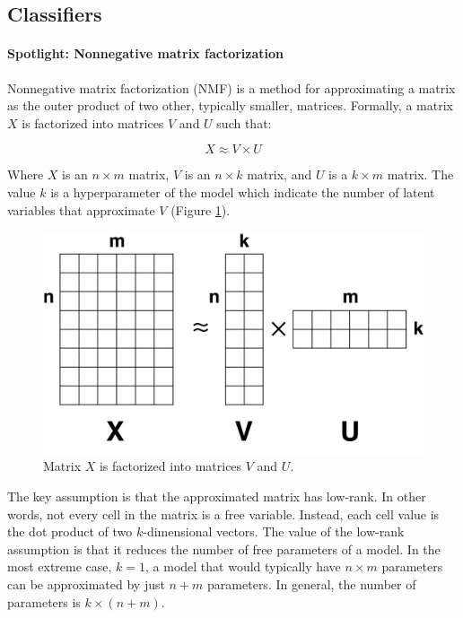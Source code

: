 \documentclass{article} %
\begin{document}
\subsection{Classifiers}\label{classifiers}

\paragraph{Spotlight: Nonnegative matrix factorization}

Nonnegative matrix factorization (NMF) is a method for approximating a matrix as the outer product of two other, typically smaller, matrices. Formally, a matrix $X$ is factorized into matrices $V$ and $U$ such that:

\begin{equation} \label{eq:1}
X \approx V \times U
\end{equation}

Where $X$ is an $n \times m$ matrix, $V$ is an $n \times k$ matrix, and $U$ is a $k \times m$ matrix. The value $k$ is a hyperparameter of the model which indicate the number of latent variables that approximate $V$ (Figure \ref{fig:matrix_completion}).

\begin{figure}[!htbp]
    \centering
    \includegraphics[scale=0.2]{figures/matrix_completion}
    \caption{\small Matrix $X$ is factorized into matrices $V$ and $U$.}
    \label{fig:matrix_completion}
\end{figure}

The key assumption is that the approximated matrix has low-rank. In other words, not every cell in the matrix is a free variable. Instead, each cell value is the dot product of two $k$-dimensional vectors. The value of the low-rank assumption is that it reduces the number of free parameters of a model. In the most extreme case, $k=1$, a model that would typically have $n \times m$ parameters can be approximated by just $n + m$ parameters. In general, the number of parameters is $k \times (n + m)$.
\end{document}
